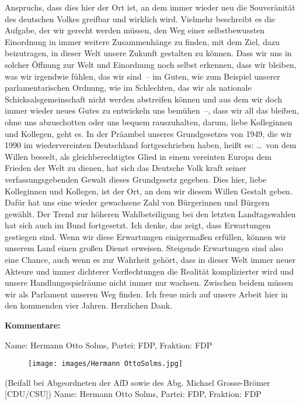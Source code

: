 \documentclass[10pt, a4paper]{report}
\begin{document}
Anspruchs, dass dies hier der Ort ist, an dem immer wieder neu die Souveränität des deutschen Volkes greifbar und wirklich wird. Vielmehr beschreibt es die Aufgabe, der wir gerecht werden müssen, den Weg einer selbstbewussten Einordnung in immer weitere Zusammenhänge zu finden, mit dem Ziel, dazu beizutragen, in dieser Welt unsere Zukunft gestalten zu können. Dass wir uns in solcher Öffnung zur Welt und Einordnung noch selbst erkennen, dass wir bleiben, was wir irgendwie fühlen, das wir sind – im Guten, wie zum Beispiel unserer parlamentarischen Ordnung, wie im Schlechten, das wir als nationale Schicksalsgemeinschaft nicht werden abstreifen können und aus dem wir doch immer wieder neues Gutes zu entwickeln uns bemühen –, dass wir all das bleiben, ohne uns abzuschotten oder uns bequem rauszuhalten, darum, liebe Kolleginnen und Kollegen, geht es. In der Präambel unseres Grundgesetzes von 1949, die wir 1990 im wiedervereinten Deutschland fortgeschrieben haben, heißt es: … von dem Willen beseelt, als gleichberechtigtes Glied in einem vereinten Europa dem Frieden der Welt zu dienen, hat sich das Deutsche Volk kraft seiner verfassungsgebenden Gewalt dieses Grundgesetz gegeben. Dies hier, liebe Kolleginnen und Kollegen, ist der Ort, an dem wir diesem Willen Gestalt geben. Dafür hat uns eine wieder gewachsene Zahl von Bürgerinnen und Bürgern gewählt. Der Trend zur höheren Wahlbeteiligung bei den letzten Landtagswahlen hat sich auch im Bund fortgesetzt. Ich denke, das zeigt, dass Erwartungen gestiegen sind. Wenn wir diese Erwartungen einigermaßen erfüllen, können wir unserem Land einen großen Dienst erweisen. Steigende Erwartungen sind also eine Chance, auch wenn es zur Wahrheit gehört, dass in dieser Welt immer neuer Akteure und immer dichterer Verflechtungen die Realität komplizierter wird und unsere Handlungsspielräume nicht immer nur wachsen. Zwischen beidem müssen wir als Parlament unseren Weg finden. Ich freue mich auf unsere Arbeit hier in den kommenden vier Jahren. Herzlichen Dank. 

\textbf{Kommentare:}

Name: Hermann Otto Solms, Partei: FDP, Fraktion: FDP

\begin{figure}[!ht]
\texttt{[image: images/Hermann OttoSolms.jpg]}
\end{figure}


(Beifall bei Abgeordneten der AfD sowie des Abg. Michael Grosse-Brömer [CDU/CSU])
Name: Hermann Otto Solms, Partei: FDP, Fraktion: FDP
\end{document}
